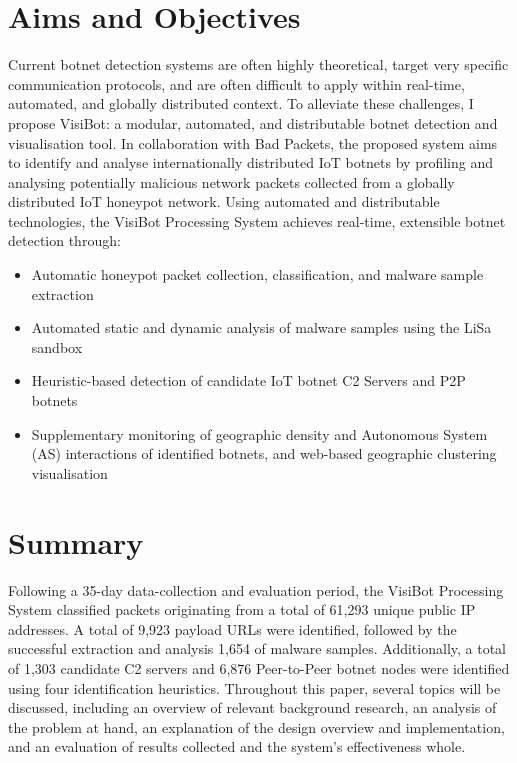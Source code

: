 \section{Aims and Objectives}

Current botnet detection systems are often highly theoretical, target very specific communication protocols, and are often difficult to apply within real-time, automated, and globally distributed context. To alleviate these challenges, I propose VisiBot: a modular, automated, and distributable botnet detection and visualisation tool. In collaboration with Bad Packets, \citep{BadPackets} the proposed system aims to identify and analyse internationally distributed IoT botnets by profiling and analysing potentially malicious network packets collected from a globally distributed IoT honeypot network. Using automated and distributable technologies, the VisiBot Processing System achieves real-time, extensible botnet detection through:

\begin{itemize}
    \item Automatic honeypot packet collection, classification, and malware sample extraction
    \item Automated static and dynamic analysis of malware samples using the LiSa sandbox \citep{LiSa}
    \item Heuristic-based detection of candidate IoT botnet C2 Servers and P2P botnets
    \item Supplementary monitoring of geographic density and Autonomous System (AS) interactions of identified botnets, and web-based geographic clustering visualisation
\end{itemize}

\section{Summary}

Following a 35-day data-collection and evaluation period, the VisiBot Processing System classified packets originating from a total of 61,293 unique public IP addresses. A total of 9,923 payload URLs were identified, followed by the successful extraction and analysis 1,654 of malware samples. Additionally, a total of 1,303 candidate C2 servers and 6,876 Peer-to-Peer botnet nodes were identified using four identification heuristics. Throughout this paper, several topics will be discussed, including an overview of relevant background research, an analysis of the problem at hand, an explanation of the design overview and implementation, and an evaluation of results collected and the system's effectiveness whole.